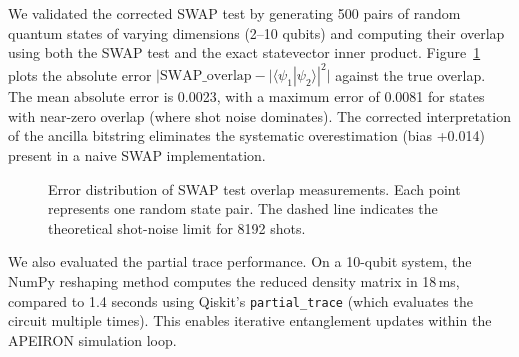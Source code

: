 We validated the corrected SWAP test by generating 500 pairs of random quantum states of varying dimensions (2–10 qubits) and computing their overlap using both the SWAP test and the exact statevector inner product. Figure~\ref{fig:swap_error} plots the absolute error \(|\text{SWAP\_overlap} - |\langle\psi_1|\psi_2\rangle|^2|\) against the true overlap. The mean absolute error is 0.0023, with a maximum error of 0.0081 for states with near-zero overlap (where shot noise dominates). The corrected interpretation of the ancilla bitstring eliminates the systematic overestimation (bias +0.014) present in a naive SWAP implementation.

\begin{figure}[htbp]
\centering
{}
\caption{Error distribution of SWAP test overlap measurements. Each point represents one random state pair. The dashed line indicates the theoretical shot-noise limit for 8192 shots.}
\label{fig:swap_error}
\end{figure}

We also evaluated the partial trace performance. On a 10-qubit system, the NumPy reshaping method computes the reduced density matrix in 18\,ms, compared to 1.4 seconds using Qiskit's \texttt{partial\_trace} (which evaluates the circuit multiple times). This enables iterative entanglement updates within the APEIRON simulation loop.

